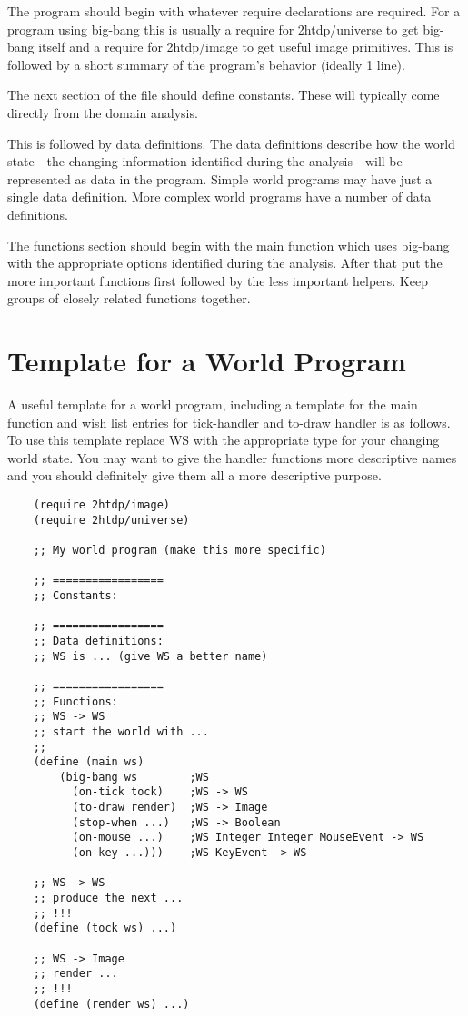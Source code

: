 \documentclass[11pt,a4paper]{report}
\begin{document}
	The program should begin with whatever require declarations are required. For a program using
	big-bang this is usually a require for 2htdp/universe to get big-bang itself and a require for
	2htdp/image to get useful image primitives. This is followed by a short summary of the
	program's behavior (ideally 1 line).
	
	The next section of the file should define constants. These will typically come directly from the
	domain analysis.
	
	This is followed by data definitions. The data definitions describe how the world state - the
	changing information identified during the analysis - will be represented as data in the program.
	Simple world programs may have just a single data definition. More complex world programs have
	a number of data definitions.
	
	The functions section should begin with the main function which uses big-bang with the
	appropriate options identified during the analysis. After that put the more important functions first
	followed by the less important helpers. Keep groups of closely related functions together.
	
	\section{Template for a World Program}
	A useful template for a world program, including a template for the main function and wish list
	entries for tick-handler and to-draw handler is as follows. To use this template replace WS with
	the appropriate type for your changing world state. You may want to give the handler functions
	more descriptive names and you should definitely give them all a more descriptive purpose.
	
	\begin{verbatim}
	(require 2htdp/image)
	(require 2htdp/universe)
	
	;; My world program (make this more specific)
	
	;; =================
	;; Constants:
	
	;; =================
	;; Data definitions:
	;; WS is ... (give WS a better name)
	
	;; =================
	;; Functions:
	;; WS -> WS
	;; start the world with ...
	;;
	(define (main ws)
		(big-bang ws        ;WS
		  (on-tick tock)    ;WS -> WS
		  (to-draw render)  ;WS -> Image
		  (stop-when ...)   ;WS -> Boolean
		  (on-mouse ...)    ;WS Integer Integer MouseEvent -> WS
		  (on-key ...)))    ;WS KeyEvent -> WS
	
	;; WS -> WS
	;; produce the next ...
	;; !!!
	(define (tock ws) ...)
	
	;; WS -> Image
	;; render ...
	;; !!!
	(define (render ws) ...)
	\end{verbatim}
	
\end{document}
